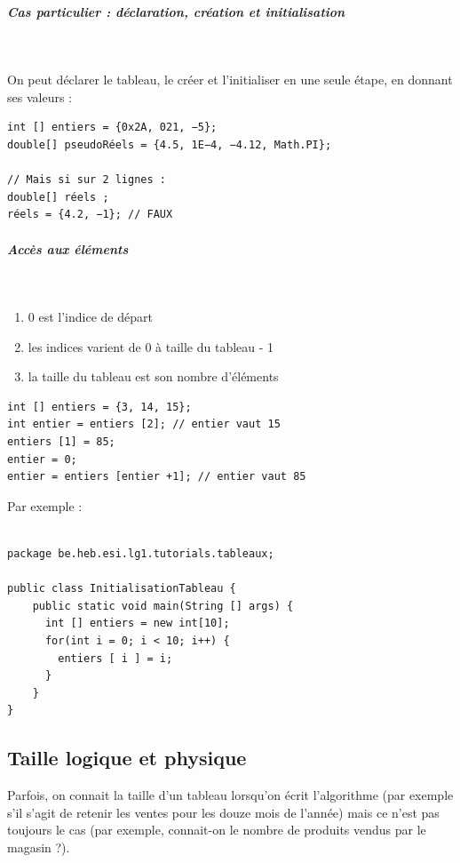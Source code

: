 \documentclass[11pt,a4paper]{article}
\begin{document}
		\subparagraph{Cas particulier : d\'eclaration, cr\'eation et initialisation} 
		
					\textcolor{white}{.} \par
				
        On peut d\'eclarer le tableau, le cr\'eer et l'initialiser en une seule \'etape, en donnant ses valeurs :
      
            \par
        \begin{verbatim}
int [] entiers = {0x2A, 021, −5};
double[] pseudoRéels = {4.5, 1E−4, −4.12, Math.PI};

// Mais si sur 2 lignes :
double[] réels ;
réels = {4.2, −1}; // FAUX
      \end{verbatim}
			
		\subparagraph{Acc\`es aux \'el\'ements} 
		
					\textcolor{white}{.} \par
				
					\begin{enumerate}
				
			\item 0 est l'indice de d\'epart
			\item les indices varient de 0 \`a taille du tableau - 1
			\item la taille du tableau est son nombre d'\'el\'ements
					\end{enumerate}
				
            \par
        \begin{verbatim}
int [] entiers = {3, 14, 15};
int entier = entiers [2]; // entier vaut 15
entiers [1] = 85;
entier = 0;
entier = entiers [entier +1]; // entier vaut 85
      \end{verbatim}Par exemple :
            \par
        \begin{verbatim}

package be.heb.esi.lg1.tutorials.tableaux;

public class InitialisationTableau {
    public static void main(String [] args) {
      int [] entiers = new int[10];
      for(int i = 0; i < 10; i++) {
        entiers [ i ] = i;
      }
    }
}\end{verbatim}\subsection{Taille logique et physique}
		    Parfois, on connait la taille d'un tableau lorsqu'on \'ecrit l'algorithme (par exemple s'il s'agit
        de retenir les ventes pour les douze mois de l'ann\'ee) mais ce n'est pas toujours le cas (par
        exemple, connait-on le nombre de produits vendus par le magasin ?).
		  
\end{document}
